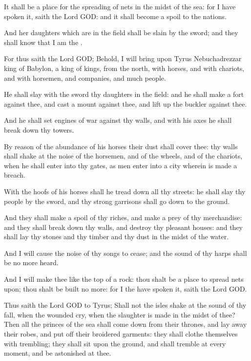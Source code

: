\verse It shall be a place for the spreading of nets in the midst of the sea: for I have spoken it, saith the Lord GOD: and it shall become a spoil to the nations.

\verse And her daughters which are in the field shall be slain by the sword; and they shall know that I am the \LORD.

\verse For thus saith the Lord GOD; Behold, I will bring upon Tyrus Nebuchadrezzar king of Babylon, a king of kings, from the north, with horses, and with chariots, and with horsemen, and companies, and much people.

\verse He shall slay with the sword thy daughters in the field: and he shall make a fort against thee, and cast a mount against thee, and lift up the buckler against thee.

\verse And he shall set engines of war against thy walls, and with his axes he shall break down thy towers.

\verse By reason of the abundance of his horses their dust shall cover thee: thy walls shall shake at the noise of the horsemen, and of the wheels, and of the chariots, when he shall enter into thy gates, as men enter into a city wherein is made a breach.

\verse With the hoofs of his horses shall he tread down all thy streets: he shall slay thy people by the sword, and thy strong garrisons shall go down to the ground.

\verse And they shall make a spoil of thy riches, and make a prey of thy merchandise: and they shall break down thy walls, and destroy thy pleasant houses: and they shall lay thy stones and thy timber and thy dust in the midst of the water.

\verse And I will cause the noise of thy songs to cease; and the sound of thy harps shall be no more heard.

\verse And I will make thee like the top of a rock: thou shalt be a place to spread nets upon; thou shalt be built no more: for I the \LORD have spoken it, saith the Lord GOD.

\verse Thus saith the Lord GOD to Tyrus; Shall not the isles shake at the sound of thy fall, when the wounded cry, when the slaughter is made in the midst of thee?  \verse Then all the princes of the sea shall come down from their thrones, and lay away their robes, and put off their broidered garments: they shall clothe themselves with trembling; they shall sit upon the ground, and shall tremble at every moment, and be astonished at thee.

